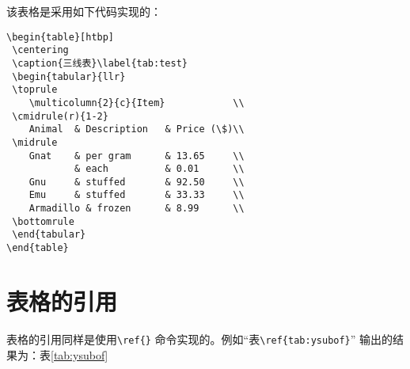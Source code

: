 该表格是采用如下代码实现的：
\begin{verbatim}
\begin{table}[htbp]
 \centering
 \caption{三线表}\label{tab:test}
 \begin{tabular}{llr}
 \toprule
    \multicolumn{2}{c}{Item}            \\
 \cmidrule(r){1-2}
    Animal  & Description   & Price (\$)\\
 \midrule
    Gnat    & per gram      & 13.65     \\
            & each          & 0.01      \\
    Gnu     & stuffed       & 92.50     \\
    Emu     & stuffed       & 33.33     \\
    Armadillo & frozen      & 8.99      \\
 \bottomrule
 \end{tabular}
\end{table}
\end{verbatim}

\section{表格的引用}
表格的引用同样是使用\verb|\ref{}| 命令实现的。例如“表\verb|\ref{tab:ysubof}|” 输出的结果为：表\ref{tab:ysubof}
